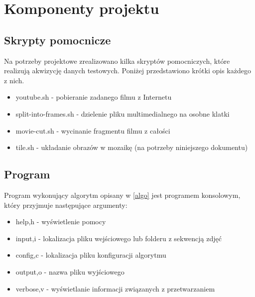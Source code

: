 \chapter{Komponenty projektu}
\section{Skrypty pomocnicze}
Na potrzeby projektowe zrealizowano kilka  skryptów pomocniczych, które realizują akwizycję danych testowych. Poniżej przedstawiono krótki opis każdego z nich.
\begin{itemize}
\item youtube.sh - pobieranie zadanego filmu z Internetu
\item split-into-frames.sh - dzielenie pliku multimedialnego na osobne klatki
\item movie-cut.sh - wycinanie fragmentu filmu z całości
\item tile.sh - układanie obrazów w mozaikę (na potrzeby niniejszego dokumentu)
\end{itemize}
\section{Program}
Program wykonujący algorytm opisany w \ref{algo} jest programem konsolowym, który przyjmuje następujące argumenty:
\begin{itemize}
\item help,h - wyświetlenie pomocy
\item input,i - lokalizacja pliku wejściowego lub folderu z sekwencją zdjęć
\item config,c - lokalizacja pliku konfiguracji algorytmu
\item output,o - nazwa pliku wyjściowego
\item verbose,v - wyświetlanie informacji związanych z przetwarzaniem
\end{itemize}
\newpage
